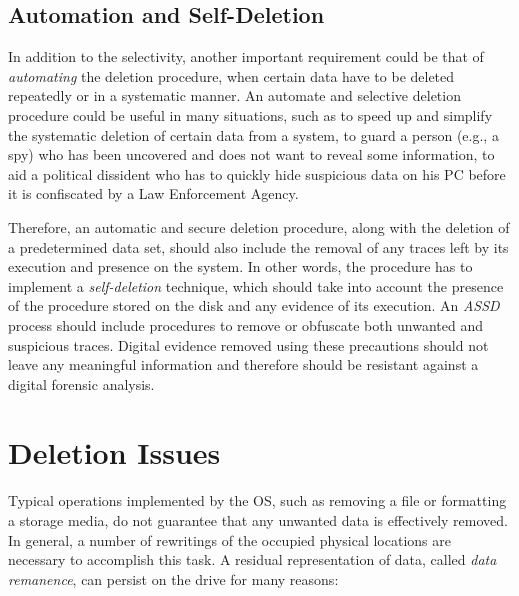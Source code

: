 \documentclass[10pt, conference, compsocconf]{IEEEtran}
\newcommand{\assd}{\emph{ASSD}\xspace}
\begin{document}
\subsection{Automation and Self-Deletion}
In addition to the selectivity, another important requirement could be that of \textit{automating} the deletion procedure, when certain data have to be deleted repeatedly or in a systematic manner. An automate and selective deletion procedure could be useful in many situations, such as to speed up and simplify the systematic deletion of certain data from a system, to guard a person (e.g., a spy) who has been uncovered and does not want to reveal some information, to aid a political dissident who has to quickly hide suspicious data on his PC before it is confiscated by a Law Enforcement Agency.

Therefore, an automatic and secure deletion procedure, along with the deletion of a predetermined data set, should also include the removal of any traces left by its execution and presence on the system. In other words, the procedure has to implement a \textit{self-deletion} technique, which should take into account the presence of the procedure stored on the disk and any evidence of its execution. An \assd process should include procedures to remove or obfuscate both unwanted and suspicious traces.
Digital evidence removed using these precautions should not leave any meaningful information and therefore should be resistant against a digital forensic analysis.


\section{Deletion Issues}
Typical operations implemented by the OS, such as removing a file or formatting a storage media, do not guarantee that any unwanted data is effectively removed.
In general, a number of rewritings of the occupied physical locations are necessary to accomplish this task.
A residual representation of data, called \textit{data remanence}, can persist on the drive for many reasons:
\end{document}
